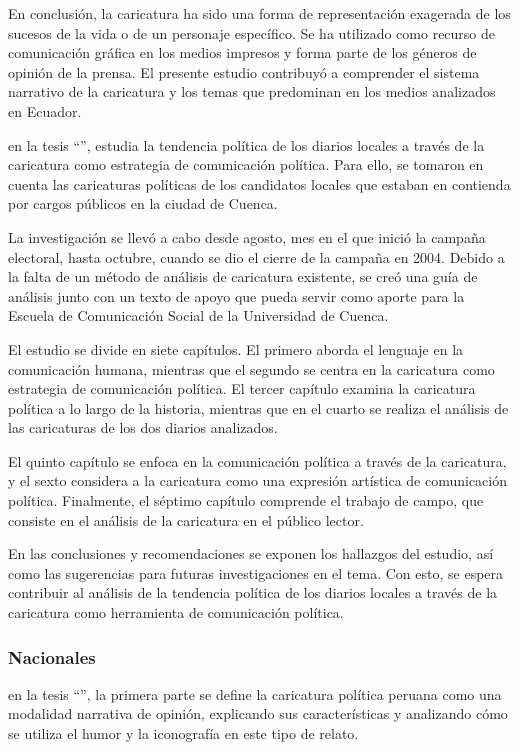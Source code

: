 \documentclass[12pt,a4paper]{article}
\begin{document}
En conclusión, la caricatura ha sido una forma de representación exagerada de los sucesos de la vida o de un personaje específico. Se ha utilizado como recurso de comunicación gráfica en los medios impresos y forma parte de los géneros de opinión de la prensa. El presente estudio contribuyó a comprender el sistema narrativo de la caricatura y los temas que predominan en los medios analizados en Ecuador.


\cite{bravo_quezada_alisis_2018} en la tesis  ``'', estudia la tendencia política de los diarios locales a través de la caricatura como estrategia de comunicación política. Para ello, se tomaron en cuenta las caricaturas políticas de los candidatos locales que estaban en contienda por cargos públicos en la ciudad de Cuenca.

La investigación se llevó a cabo desde agosto, mes en el que inició la campaña electoral, hasta octubre, cuando se dio el cierre de la campaña en 2004. Debido a la falta de un método de análisis de caricatura existente, se creó una guía de análisis junto con un texto de apoyo que pueda servir como aporte para la Escuela de Comunicación Social de la Universidad de Cuenca.

El estudio se divide en siete capítulos. El primero aborda el lenguaje en la comunicación humana, mientras que el segundo se centra en la caricatura como estrategia de comunicación política. El tercer capítulo examina la caricatura política a lo largo de la historia, mientras que en el cuarto se realiza el análisis de las caricaturas de los dos diarios analizados.

El quinto capítulo se enfoca en la comunicación política a través de la caricatura, y el sexto considera a la caricatura como una expresión artística de comunicación política. Finalmente, el séptimo capítulo comprende el trabajo de campo, que consiste en el análisis de la caricatura en el público lector.

En las conclusiones y recomendaciones se exponen los hallazgos del estudio, así como las sugerencias para futuras investigaciones en el tema. Con esto, se espera contribuir al análisis de la tendencia política de los diarios locales a través de la caricatura como herramienta de comunicación política.



\subsubsection{Nacionales}
\cite{felix_seras_caricatura_2013} en la tesis  ``'',  la primera parte se define la caricatura política peruana como una modalidad narrativa de opinión, explicando sus características y analizando cómo se utiliza el humor y la iconografía en este tipo de relato.
\end{document}
